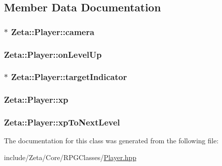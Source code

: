 \subsection{Member Data Documentation}
\hypertarget{classZeta_1_1Player_a6c696154bc9063a4ec37dc76ddae56e3}{
\subsubsection[{camera}]{$\ast$ Zeta\+::\+Player\+::camera\hspace{0.3cm}{\ttfamily [private]}}}\label{classZeta_1_1Player_a6c696154bc9063a4ec37dc76ddae56e3}
\hypertarget{classZeta_1_1Player_a514a6c8dab45dc80d2c8cfc3ad472345}{
\subsubsection[{on\+Level\+Up}]{ Zeta\+::\+Player\+::on\+Level\+Up\hspace{0.3cm}{\ttfamily [private]}}}\label{classZeta_1_1Player_a514a6c8dab45dc80d2c8cfc3ad472345}
\hypertarget{classZeta_1_1Player_a50f0a0349f1969acae952aada0ae16d6}{
\subsubsection[{target\+Indicator}]{$\ast$ Zeta\+::\+Player\+::target\+Indicator\hspace{0.3cm}{\ttfamily [private]}}}\label{classZeta_1_1Player_a50f0a0349f1969acae952aada0ae16d6}
\hypertarget{classZeta_1_1Player_ac438ac12c1f3996494083d2fc6e351bc}{
\subsubsection[{xp}]{ Zeta\+::\+Player\+::xp\hspace{0.3cm}{\ttfamily [private]}}}\label{classZeta_1_1Player_ac438ac12c1f3996494083d2fc6e351bc}
\hypertarget{classZeta_1_1Player_a47b3afa0d89ecca9f1cd50174d8f549e}{
\subsubsection[{xp\+To\+Next\+Level}]{ Zeta\+::\+Player\+::xp\+To\+Next\+Level\hspace{0.3cm}{\ttfamily [private]}}}\label{classZeta_1_1Player_a47b3afa0d89ecca9f1cd50174d8f549e}


The documentation for this class was generated from the following file\+:\begin{DoxyCompactItemize}
\item 
include/\+Zeta/\+Core/\+R\+P\+G\+Classes/\hyperlink{Player_8hpp}{Player.\+hpp}\end{DoxyCompactItemize}
